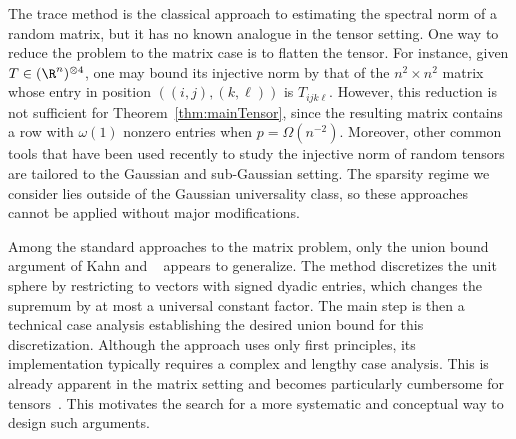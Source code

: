\documentclass[11pt,a4paper]{article}
\begin{document}
The trace method is the classical approach to estimating the spectral norm of a random matrix, but it has no known analogue in the tensor setting.
One way to reduce the problem to the matrix case is to flatten the tensor.
For instance, given $T\in (\R^n)^{\otimes 4}$, one
may bound its injective norm by that of the $n^2\times n^2$ matrix whose entry in position $((i,j),(k,\ell))$ is $T_{ijk\ell}$. However, this reduction is not sufficient for Theorem~\ref{thm:mainTensor},
since the resulting matrix contains a
row with $\omega(1)$ nonzero entries
when
$p=\Omega(n^{-2})$.
Moreover, other common tools that have been used recently to study the injective norm of random tensors~\cite{aden2025injective,2024DartoisMcKenna,dartois2026moment,marchTensor,tensorConcentration,al2025sharp} are tailored to the Gaussian and sub-Gaussian setting. 
The sparsity regime we consider lies outside of the Gaussian universality class, so these approaches cannot be applied without major modifications.

Among the standard approaches to the matrix problem, only the union bound argument
of Kahn and \Szemeredi~\cite{kahnSzemeredi}
appears to generalize. 
The method discretizes the unit sphere by restricting to
vectors with signed dyadic entries, which changes the supremum by at
most a universal constant factor.
The main step is then a technical case analysis establishing the desired union bound for this discretization. 
Although the
approach uses only first principles, its implementation typically
requires a complex and lengthy case analysis. This is already apparent in the
matrix setting and becomes particularly cumbersome for tensors~\cite{kahnSzemeredi,friedmanWigderson,feigeOfek,tensorCompletionJain,
feigeOfekBoosted,sparseTensorZhou}.
This motivates the search for a more systematic and conceptual way to design such arguments.
\end{document}
